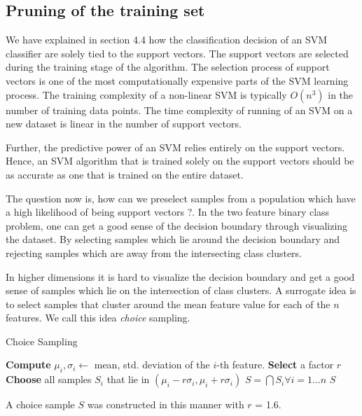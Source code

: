 \documentclass[final,3p,times,twocolumn]{elsarticle}
\begin{document}
\label{learning_pipe}
\subsection{Pruning of the training set}

We have explained in section 4.4 how the classification decision of an SVM classifier are solely tied to the support vectors. The support vectors are selected during the training stage of the algorithm. The selection process of support vectors  is one of the most computationally expensive parts of the SVM learning process. The training complexity of a non-linear SVM is typically $O(n^{3})$ in the number of training data points. The time complexity of running of an SVM on a new dataset is linear in the number of support vectors.

Further, the predictive power of an SVM relies entirely on the support vectors. Hence, an SVM algorithm that is trained solely on the support vectors  should be as accurate as one that is trained on the entire dataset. 

The question now is, how can we preselect samples from a population which have a high likelihood of being support vectors ?. In the two feature binary class problem, one can get a good sense of the decision boundary through visualizing the dataset. By selecting samples which lie around the decision boundary and rejecting samples which are away from the intersecting class clusters.

In higher dimensions it is hard to visualize the decision boundary and get a good sense of samples which lie on the intersection of class clusters. A surrogate idea is to select samples that cluster around the mean feature value for each of the $n$ features. We call this idea \textit{choice} sampling. 

\begin{algorithm}
\caption{Choice Sampling}
\begin{algorithmic}[1]
\STATE \textbf{Compute} $\mu_{i}, \sigma_{i} \leftarrow$ mean, std. deviation of the $i$-th feature. 
\STATE \textbf{Select} a factor $r$ 
\STATE \textbf{Choose} all samples $S_{i}$ that lie in $(\mu_{i}-r\sigma_{i},\mu_{i}+r\sigma_{i})$ 
\ENDFOR
\STATE $S = \bigcap S_{i} \forall i=1...n$  
\RETURN $S$
\end{algorithmic}
\label{choicealgo}
\end{algorithm}

A choice sample $S$ was constructed in this manner with $r$ = 1.6.
\end{document}
